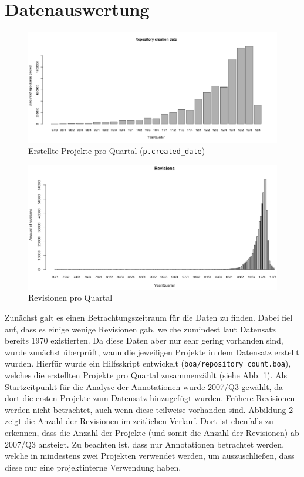 \documentclass[11pt,a4paper,parskip=full]{scrartcl}
\begin{document}
\section{Datenauswertung}

\begin{figure}
	\includegraphics[width=\textwidth]{plots/repository_creation.png}
	\caption{Erstellte Projekte pro Quartal (\texttt{p.created\_date})}
	\label{projectCreation}
\end{figure}

\begin{figure}
	\includegraphics[width=\textwidth]{plots/revisions.png}
	\caption{Revisionen pro Quartal}
	\label{revisions}
\end{figure}


Zunächst galt es einen Betrachtungszeitraum für die Daten zu finden. Dabei fiel auf, dass es einige wenige Revisionen gab, welche zumindest laut Datensatz bereits 1970 existierten. Da diese Daten aber nur sehr gering vorhanden sind, wurde zunächst überprüft, wann die jeweiligen Projekte in dem Datensatz erstellt wurden. Hierfür wurde ein Hilfsskript entwickelt (\texttt{boa/repository\_count.boa}), welches die erstellten Projekte pro Quartal zusammenzählt (siehe Abb. \ref{projectCreation}). Als Startzeitpunkt für die Analyse der Annotationen wurde 2007/Q3 gewählt, da dort die ersten Projekte zum Datensatz hinzugefügt wurden. Frühere Revisionen werden nicht betrachtet, auch wenn diese teilweise vorhanden sind. Abbildung \ref{revisions} zeigt die Anzahl der Revisionen im zeitlichen Verlauf. Dort ist ebenfalls zu erkennen, dass die Anzahl der Projekte (und somit die Anzahl der Revisionen) ab 2007/Q3 ansteigt. Zu beachten ist, dass nur Annotationen betrachtet werden, welche in mindestens zwei Projekten verwendet werden, um auszuschließen, dass diese nur eine projektinterne Verwendung haben.\par
\end{document}
